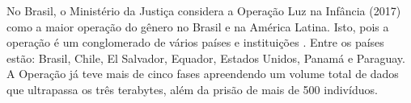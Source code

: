 

No Brasil, o Ministério da Justiça considera a Operação Luz na Infância (2017) como a maior operação do gênero no Brasil e na América Latina. Isto, pois a operação é um conglomerado de vários países e instituições \cite{souza2018sabemos}. Entre os países estão: Brasil, Chile, El Salvador, Equador, Estados Unidos, Panamá e Paraguay. A Operação já teve mais de cinco fases apreendendo um volume total de dados que ultrapassa os três terabytes, além da prisão de mais de 500 indivíduos. 


